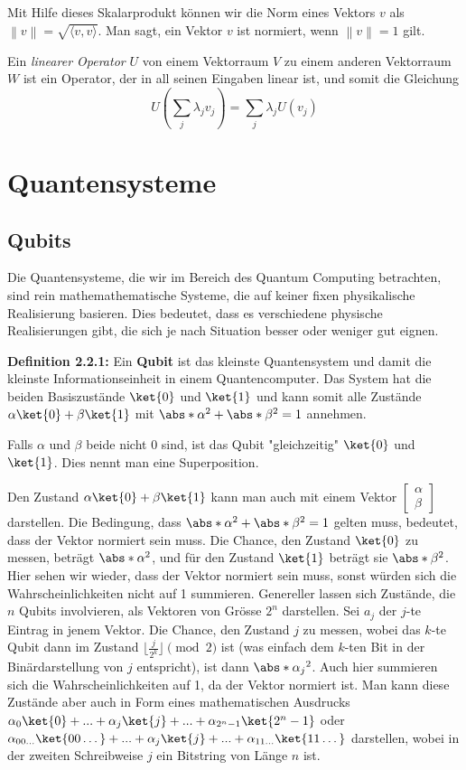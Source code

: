 Mit Hilfe dieses Skalarprodukt können wir die Norm eines Vektors $v$ als $\left\| v \right\| = \sqrt{\langle v, v \rangle}$. Man sagt, ein Vektor $v$ ist normiert, wenn $\left\| v \right\| = 1$ gilt.

Ein \textit{linearer Operator} $U$ von einem Vektorraum $V$ zu einem anderen Vektorraum $W$ ist ein Operator, der in all seinen Eingaben linear ist, und somit die Gleichung $$U(\sum_j{\lambda_j v_j}) = \sum_j\lambda_j U(v_j)$$
\section{Quantensysteme}
\subsection{Qubits}
Die Quantensysteme, die wir im Bereich des Quantum Computing betrachten, sind rein mathemathematische Systeme, die auf keiner fixen physikalische Realisierung basieren. Dies bedeutet, dass es verschiedene physische Realisierungen gibt, die sich je nach Situation besser oder weniger gut eignen.

\textbf{Definition 2.2.1:} Ein \textbf{Qubit} ist das kleinste Quantensystem und damit die kleinste Informationseinheit in einem Quantencomputer. Das System hat die beiden Basiszustände $\ket{0}$ und $\ket{1}$ und kann somit alle Zustände $\alpha\ket{0} + \beta\ket{1}$ mit $\abs*{\alpha}^2 + \abs*{\beta}^2 = 1$ annehmen.

Falls $\alpha$ und $\beta$ beide nicht 0 sind, ist das Qubit "gleichzeitig" $\ket{0}$ und $\ket{1}$. Dies nennt man eine Superposition. 

Den Zustand $\alpha\ket{0} + \beta\ket{1}$ kann man auch mit einem Vektor $\begin{bmatrix}\alpha \\ \beta\end{bmatrix}$ darstellen. Die Bedingung, dass $\abs*{\alpha}^2 + \abs*{\beta}^2 = 1$ gelten muss, bedeutet, dass der Vektor normiert sein muss. Die Chance, den Zustand $\ket{0}$ zu messen, beträgt $\abs*{\alpha}^2$, und für den Zustand $\ket{1}$ beträgt sie $\abs*{\beta}^2$. Hier sehen wir wieder, dass der Vektor normiert sein muss, sonst würden sich die Wahrscheinlichkeiten nicht auf 1 summieren.
Genereller lassen sich Zustände, die $n$ Qubits involvieren, als Vektoren von Grösse $2^n$ darstellen. Sei $a_j$ der $j$-te Eintrag in jenem Vektor. Die Chance, den Zustand $j$ zu messen, wobei das $k$-te Qubit dann im Zustand $\lfloor \frac{j}{2^k} \rfloor \pmod{2}$ ist (was einfach dem $k$-ten Bit in der Binärdarstellung von $j$ entspricht), ist dann $\abs*{\alpha_j}^2$. Auch hier summieren sich die Wahrscheinlichkeiten auf 1, da der Vektor normiert ist. Man kann diese Zustände aber auch in Form eines mathematischen Ausdrucks $\alpha_0\ket{0} + ... + \alpha_j\ket{j} + ... + \alpha_{2^n - 1}\ket{2^n - 1}$ oder $\alpha_{00\dots}\ket{00\dots} + ... + \alpha_{j}\ket{j} + ... + \alpha_{11\dots}\ket{11\dots}$ darstellen, wobei in der zweiten Schreibweise $j$ ein Bitstring von Länge $n$ ist.

